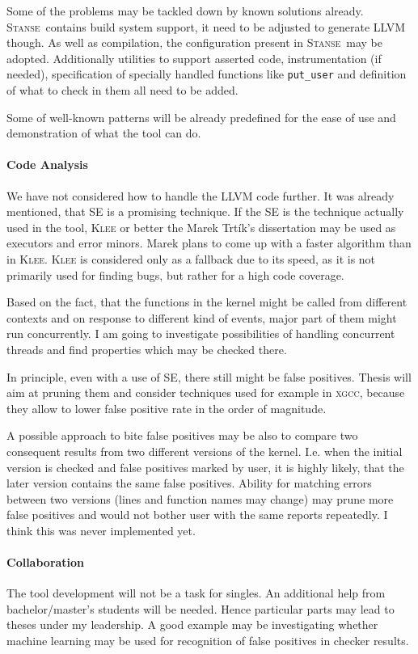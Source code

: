 \documentclass[11pt,a4paper]{article}
\newcommand{\stan}{\textsc{Stanse}}
\begin{document}
Some of the problems may be tackled down by known solutions already. \stan\ 
contains build system support, it need to be adjusted to generate LLVM though.
As well as compilation, the configuration present in \stan\ may be adopted.
Additionally utilities to support asserted code, instrumentation (if needed),
specification of specially handled functions like \texttt{put\_user} and
definition of what to check in them all need to be added.

Some of well-known patterns will be already predefined for the ease of use
and demonstration of what the tool can do.

\paragraph{Code Analysis} We have not considered how to handle the LLVM code
further. It was already mentioned, that SE is a promising technique. If the SE
is the technique actually used in the tool, \textsc{Klee} or better the Marek
Trtík's dissertation may be used as executors and error minors. Marek plans to
come up with a faster algorithm than in \textsc{Klee}. \textsc{Klee} is
considered only as a fallback due to its speed, as it is not primarily used
for finding bugs, but rather for a high code coverage.

Based on the fact, that the functions in the kernel might be called from
different contexts and on response to different kind of events, major part of
them might run concurrently. I am going to investigate possibilities of
handling concurrent threads and find properties which may be checked there.

In principle, even with a use of SE, there still might be false positives.
Thesis will aim at pruning them and consider techniques used for example in
\textsc{xgcc}, because they allow to lower false positive rate in the order of
magnitude.

A possible approach to bite false positives may be also to compare two
consequent results from two different versions of the kernel. I.e. when the
initial version is checked and false positives marked by user, it is highly
likely, that the later version contains the same false positives. Ability for
matching errors between two versions (lines and function names may change) may
prune more false positives and would not bother user with the same reports
repeatedly. I think this was never implemented yet.

\paragraph{Collaboration} The tool development will not be a task for singles.
An additional help from bachelor/master's students will be needed. Hence
particular parts may lead to theses under my leadership. A good example may be
investigating whether machine learning may be used for recognition of false
positives in checker results.
\end{document}
